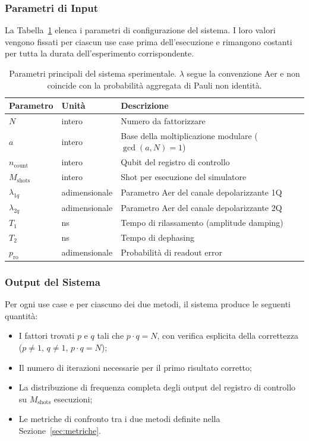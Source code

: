 \begin{onehalfspace}
\subsubsection{Parametri di Input}

La Tabella~\ref{tab:input_params} elenca i parametri di configurazione del sistema. I loro valori vengono fissati per ciascun use case prima dell'esecuzione e rimangono costanti per tutta la durata dell'esperimento corrispondente.

\begin{table}[H]
\centering
\begin{tabular}{@{}lll@{}}
\toprule
\textbf{Parametro}  & \textbf{Unità} & \textbf{Descrizione} \\
\midrule
$N$                 & intero         & Numero da fattorizzare \\
$a$                 & intero         & Base della moltiplicazione modulare ($\gcd(a,N)=1$) \\
$n_{\text{count}}$  & intero         & Qubit del registro di controllo \\
$M_{\text{shots}}$  & intero         & Shot per esecuzione del simulatore \\
$\lambda_{1q}$      & adimensionale  & Parametro Aer del canale depolarizzante 1Q \\
$\lambda_{2q}$      & adimensionale  & Parametro Aer del canale depolarizzante 2Q \\
$T_1$               & ns             & Tempo di rilassamento (amplitude damping) \\
$T_2$               & ns             & Tempo di dephasing \\
$p_{\text{ro}}$     & adimensionale  & Probabilità di readout error \\
\bottomrule
\end{tabular}
\caption{Parametri principali del sistema sperimentale. $\lambda$ segue la convenzione Aer e non coincide con la probabilità aggregata di Pauli non identità.}
\label{tab:input_params}
\end{table}

\subsubsection{Output del Sistema}

Per ogni use case e per ciascuno dei due metodi, il sistema produce le seguenti quantità:

\begin{itemize}
    \item I fattori trovati $p$ e $q$ tali che $p \cdot q = N$, con verifica esplicita della correttezza ($p \neq 1$, $q \neq 1$, $p \cdot q = N$);
    \item Il numero di iterazioni necessarie per il primo risultato corretto;
    \item La distribuzione di frequenza completa degli output del registro di controllo su $M_{\text{shots}}$ esecuzioni;
    \item Le metriche di confronto tra i due metodi definite nella Sezione~\ref{sec:metriche}.
\end{itemize}


\end{onehalfspace}
